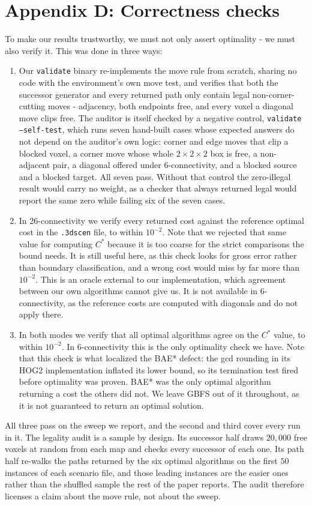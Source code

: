 \documentclass[letterpaper]{article} %
\begin{document}
\section{Appendix D: Correctness checks}\label{app:d}
To make our results trustworthy, we must not only assert optimality - we must also verify it. This was done in three ways:
\begin{enumerate}
  \item Our \texttt{validate} binary re-implements the move rule from scratch, sharing no code with the environment's own move test, and verifies that both the successor generator and every returned path only contain legal non-corner-cutting moves - adjacency, both endpoints free, and every voxel a diagonal move clips free. The auditor is itself checked by a negative control, \texttt{validate --self-test}, which runs seven hand-built cases whose expected answers do not depend on the auditor's own logic: corner and edge moves that clip a blocked voxel, a corner move whose whole $2\times2\times2$ box is free, a non-adjacent pair, a diagonal offered under 6-connectivity, and a blocked source and a blocked target. All seven pass. Without that control the zero-illegal result would carry no weight, as a checker that always returned legal would report the same zero while failing six of the seven cases.
  \item In 26-connectivity we verify every returned cost against the reference optimal cost in the \texttt{.3dscen} file, to within $10^{-2}$. Note that we rejected that same value for computing $C^*$ because it is too coarse for the strict comparisons the bound needs. It is still useful here, as this check looks for gross error rather than boundary classification, and a wrong cost would miss by far more than $10^{-2}$. This is an oracle external to our implementation, which agreement between our own algorithms cannot give us. It is not available in 6-connectivity, as the reference costs are computed with diagonals and do not apply there.
  \item In both modes we verify that all optimal algorithms agree on the $C^*$ value, to within $10^{-2}$. In 6-connectivity this is the only optimality check we have. Note that this check is what localized the BAE* defect: the gcd rounding in its HOG2 implementation inflated its lower bound, so its termination test fired before optimality was proven. BAE* was the only optimal algorithm returning a cost the others did not. We leave GBFS out of it throughout, as it is not guaranteed to return an optimal solution.
\end{enumerate} All three pass on the sweep we report, and the second and third cover every run in it. The legality audit is a sample by design. Its successor half draws $20{,}000$ free voxels at random from each map and checks every successor of each one. Its path half re-walks the paths returned by the six optimal algorithms on the first $50$ instances of each scenario file, and those leading instances are the easier ones rather than the shuffled sample the rest of the paper reports. The audit therefore licenses a claim about the move rule, not about the sweep.
\end{document}
